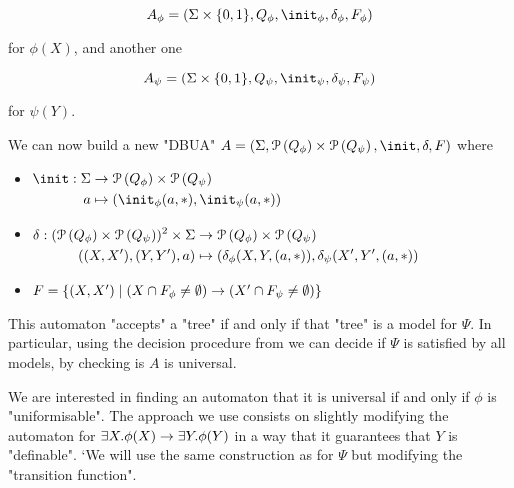 \documentclass[a4paper,UKenglish,cleveref, autoref, thm-restate]{lipics-v2021}
\begin{document}
\[
	A_{\phi} = (\Sigma \times \{0,1\}, Q_{\phi}, \init_{\phi}, \delta_{\phi}, F_{\phi})
\]

for $\phi(X)$, and another one

\[
	A_{\psi} = (\Sigma \times \{0,1\}, Q_{\psi}, \init_{\psi}, \delta_{\psi}, F_{\psi})
\]

for $\psi(Y)$.


We can now build a new "DBUA" $A = (\Sigma, \parts {Q_{\phi}} \times \parts {Q_{\psi}}, \init, \delta, F)$ where

\begin{itemize}
	\item$\begin{aligned}[t]
			      \init : \Sigma & \to      \parts {Q_{\phi}} \times \parts {Q_{\psi}} \\
			      a              & \mapsto  ( \init_{\phi}(a,*) , \init_{\psi}(a,*))
		      \end{aligned}$

	\item$\begin{aligned}[t]
			      \delta : (\mathcal{P}\left(Q_{\phi}\right) \times \mathcal{P}\left(Q_{\psi}\right))^2 \times \Sigma & \to      \mathcal{P}\left(Q_{\phi}\right) \times \mathcal{P}\left(Q_{\psi}\right)           \\
			      ((X,X'),(Y,Y'),a)                                                     & \mapsto (\delta_{\phi}(X,Y,(a,*)), \delta_{\psi}(X',Y',(a,*))
		      \end{aligned}$

	\item $F = \left\{(X,X') \mid (X \cap F_{\phi} \neq \emptyset) \rightarrow (X' \cap F_{\psi} \neq \emptyset)\right\}$
\end{itemize}

This automaton "accepts" a "tree" if and only if that "tree" is a model for $\Psi$. In particular, using the decision procedure
from  we can decide if $\Psi$ is satisfied by all models, by checking  is $A$ is universal.

We are interested in finding an automaton that it is universal if and only if $\phi$ is "uniformisable". The approach we use consists on slightly modifying
the automaton for $\exists X. \phi(X) \rightarrow \exists Y. \phi (Y)$ in a way that it guarantees that $Y$ is "definable".
`We will use the same construction as for $\Psi$ but modifying the "transition function".
\end{document}
